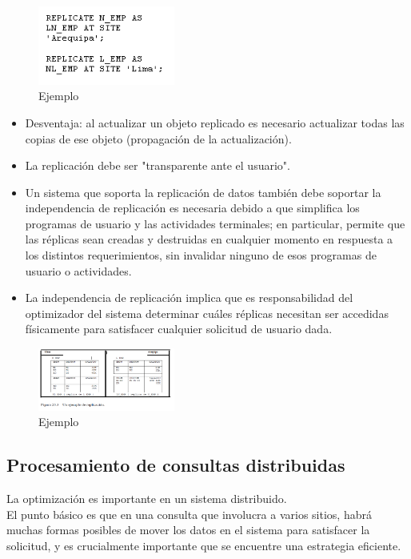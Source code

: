 \documentclass[10pt,a4paper,oneside]{article}
\begin{document}
\begin {itemize}
\begin{figure}[!h]
  \centering
    \includegraphics[width=0.4\textwidth]{fig4}
  \caption{Ejemplo}
  \label{fig:fig4}
\end{figure}
\begin{itemize}
\item Desventaja: al actualizar un objeto replicado es necesario actualizar todas las copias de ese objeto (propagaci\'on de la actualizaci\'on).
\item La replicaci\'on debe ser "transparente ante el usuario". 
\item Un sistema que soporta la replicaci\'on de datos tambi\'en debe soportar la independencia de replicaci\'on es necesaria debido a que simplifica los programas de usuario y las actividades terminales; en particular, permite que las r\'eplicas sean creadas y destruidas en cualquier momento en respuesta a los distintos requerimientos, sin invalidar ninguno de esos programas de usuario o actividades.
\item  La independencia de replicaci\'on implica que es responsabilidad del optimizador del sistema determinar cu\'ales r\'eplicas necesitan ser accedidas f\'isicamente para satisfacer cualquier solicitud de usuario dada. 
\end{itemize}
\begin{figure}[!h]
  \centering
    \includegraphics[width=0.4\textwidth]{fig3}
  \caption{Ejemplo}
  \label{fig:fig3}
\end{figure}

\subsection{Procesamiento de consultas distribuidas}
La optimizaci\'on es importante en un sistema distribuido.
\\El punto b\'asico es que en una consulta que involucra a varios sitios, habr\'a muchas formas posibles de mover los datos en el sistema para satisfacer la solicitud, y es crucialmente importante que se encuentre una estrategia eficiente. 


\end{itemize}
\end{document}
